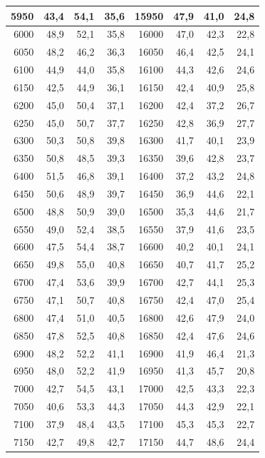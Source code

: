 \begin{small}
\begin{longtable}{|r|r|r|r|r|r|r|r|}
5950 & 43,4 & 54,1 & 35,6 & 15950 & 47,9 & 41,0 & 24,8 \\ \hline
6000 & 48,9 & 52,1 & 35,8 & 16000 & 47,0 & 42,3 & 22,8 \\ \hline
6050 & 48,2 & 46,2 & 36,3 & 16050 & 46,4 & 42,5 & 24,1 \\ \hline
6100 & 44,9 & 44,0 & 35,8 & 16100 & 44,3 & 42,6 & 24,6 \\ \hline
6150 & 42,5 & 44,9 & 36,1 & 16150 & 42,4 & 40,9 & 25,8 \\ \hline
6200 & 45,0 & 50,4 & 37,1 & 16200 & 42,4 & 37,2 & 26,7 \\ \hline
6250 & 45,0 & 50,7 & 37,7 & 16250 & 42,8 & 36,9 & 27,7 \\ \hline
6300 & 50,3 & 50,8 & 39,8 & 16300 & 41,7 & 40,1 & 23,9 \\ \hline
6350 & 50,8 & 48,5 & 39,3 & 16350 & 39,6 & 42,8 & 23,7 \\ \hline
6400 & 51,5 & 46,8 & 39,1 & 16400 & 37,2 & 43,2 & 24,8 \\ \hline
6450 & 50,6 & 48,9 & 39,7 & 16450 & 36,9 & 44,6 & 22,1 \\ \hline
6500 & 48,8 & 50,9 & 39,0 & 16500 & 35,3 & 44,6 & 21,7 \\ \hline
6550 & 49,0 & 52,4 & 38,5 & 16550 & 37,9 & 41,6 & 23,5 \\ \hline
6600 & 47,5 & 54,4 & 38,7 & 16600 & 40,2 & 40,1 & 24,1 \\ \hline
6650 & 49,8 & 55,0 & 40,8 & 16650 & 40,7 & 41,7 & 25,2 \\ \hline
6700 & 47,4 & 53,6 & 39,9 & 16700 & 42,7 & 44,1 & 25,3 \\ \hline
6750 & 47,1 & 50,7 & 40,8 & 16750 & 42,4 & 47,0 & 25,4 \\ \hline
6800 & 47,4 & 51,0 & 40,5 & 16800 & 42,6 & 47,9 & 24,0 \\ \hline
6850 & 47,8 & 52,5 & 40,8 & 16850 & 42,4 & 47,6 & 24,6 \\ \hline
6900 & 48,2 & 52,2 & 41,1 & 16900 & 41,9 & 46,4 & 21,3 \\ \hline
6950 & 48,0 & 52,2 & 41,9 & 16950 & 41,3 & 45,7 & 20,8 \\ \hline
7000 & 42,7 & 54,5 & 43,1 & 17000 & 42,5 & 43,3 & 22,3 \\ \hline
7050 & 40,6 & 53,3 & 44,3 & 17050 & 44,3 & 42,9 & 22,1 \\ \hline
7100 & 37,9 & 48,4 & 43,5 & 17100 & 45,3 & 45,3 & 22,7 \\ \hline
7150 & 42,7 & 49,8 & 42,7 & 17150 & 44,7 & 48,6 & 24,4 \\ \hline

\end{longtable}
\end{small}
